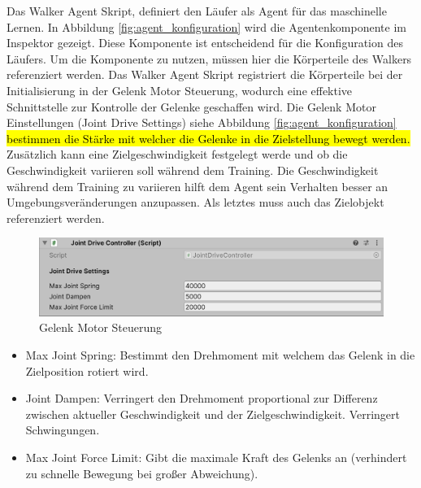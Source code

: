 Das Walker Agent Skript, definiert den Läufer als Agent für das maschinelle Lernen. In Abbildung \ref{fig:agent_konfiguration} wird die Agentenkomponente im Inspektor gezeigt. Diese Komponente ist entscheidend für die Konfiguration des Läufers. Um die Komponente zu nutzen, müssen hier die Körperteile des Walkers referenziert werden. Das Walker Agent Skript registriert die Körperteile bei der Initialisierung in der Gelenk Motor Steuerung, wodurch eine effektive Schnittstelle zur Kontrolle der Gelenke geschaffen wird. Die Gelenk Motor Einstellungen (Joint Drive Settings) siehe Abbildung \ref{fig:agent_konfiguration} \hl{bestimmen die Stärke mit welcher die Gelenke in die Zielstellung bewegt werden.} Zusätzlich kann eine Zielgeschwindigkeit festgelegt werde und ob die Geschwindigkeit variieren soll während dem Training. Die Geschwindigkeit während dem Training zu variieren hilft dem Agent sein Verhalten besser an Umgebungsveränderungen anzupassen. Als letztes muss auch das Zielobjekt referenziert werden.

\begin{figure}[H]
  \centering  
  \includegraphics[scale=0.5]{img/gelenk_motor_steuerung.png}
  \caption{Gelenk Motor Steuerung}
  \label{fig:gelenk_motor_steuerung}
\end{figure}

\begin{itemize}
  \item Max Joint Spring: Bestimmt den Drehmoment mit welchem das Gelenk in die Zielposition rotiert wird.
  \item Joint Dampen: Verringert den Drehmoment proportional zur Differenz zwischen aktueller Geschwindigkeit und der Zielgeschwindigkeit. Verringert Schwingungen.
  \item Max Joint Force Limit: Gibt die maximale Kraft des Gelenks an (verhindert zu schnelle Bewegung bei großer Abweichung).
\end{itemize}

